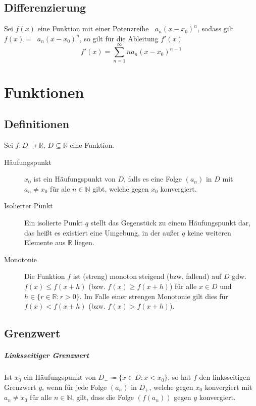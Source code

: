 \documentclass[a4paper, 11pt, accentcolor = tud3b]{tudreport}
\DeclareMathOperator{\suminfty}{\sum _ { n = 0 } ^ \infty}
\begin{document}
        \section{Differenzierung}
            Sei $ f(x) $ eine Funktion mit einer Potenzreihe $ \suminfty a _ n (x - x _ 0) ^ n $, sodass gilt $ f(x) = \suminfty a _ n (x - x _ 0) ^ n $, so gilt für die Ableitung $ f'(x) $ \[ f'(x) = \sum _ { n = 1 } ^ \infty n a _ n (x - x _ 0) ^ { n - 1 } \]

    \chapter{Funktionen}
        \section{Definitionen}
            Sei $ f : D \rightarrow \mathbb{R} $, $ D \subseteq \mathbb{R} $ eine Funktion.

            \begin{description}
                \item[Häufungspunkt] $ x _ 0 $ ist ein Häufungspunkt von $ D $, falls es eine Folge $ (a _ n) $ in $ D $ mit $ a _ n \neq x _ 0 $ für ale $ n \in \mathbb{N} $ gibt, welche gegen $ x _ 0 $ konvergiert.
                \item[Isolierter Punkt] Ein isolierte Punkt $ q $ stellt das Gegenstück zu einem Häufungspunkt dar, das heißt es existiert eine Umgebung, in der außer $ q $ keine weiteren Elemente aus $ \mathbb{R} $ liegen.
                \item[Monotonie] Die Funktion $ f $ ist (streng) monoton steigend (bzw. fallend) auf $ D $ gdw. $ f(x) \leq f(x + h) $ (bzw. $ f(x) \geq f(x + h) $) für alle $ x \in D $ und $ h \in \{ r \in \mathbb{R} : r > 0 \} $. Im Falle einer strengen Monotonie gilt dies für $ f(x) < f(x + h) $ (bzw. $ f(x) > f(x + h) $).
            \end{description}

        \section{Grenzwert}
            \paragraph{Linksseitiger Grenzwert}
                Ist $ x _ 0 $ ein Häufungspunkt von $ D _ - \coloneqq \{ x \in D : x < x _ 0 \} $, so hat $ f $ den linksseitigen Grenzwert $ y $, wenn für jede Folge $ (a _ n) $ in $ D _ + $, welche gegen $ x _ 0 $ konvergiert mit $ a _ n \neq x _ 0 $ für alle $ n \in \mathbb{N} $, gilt, dass die Folge $ (f(a _ n)) $ gegen $ y $ konvergiert.
\end{document}
